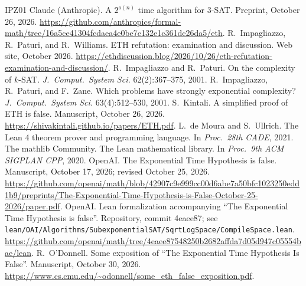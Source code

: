 \documentclass[11pt]{article}
\begin{document}
\begin{thebibliography}{IPZ01}
 Claude (Anthropic). A $2^{o(n)}$ time algorithm for 3-SAT. Preprint, October 26, 2026. \url{https://github.com/anthropics/formal-math/tree/16a5ce41304fcdaea4e0be7c132e1c361dc26da5/eth}.
 R.~Impagliazzo, R.~Paturi, and R.~Williams. ETH refutation: examination and discussion. Web site, October 2026. \url{https://ethdiscussion.blog/2026/10/26/eth-refutation-examination-and-discussion/}.
 R.~Impagliazzo and R.~Paturi. On the complexity of $k$-SAT. \emph{J.\ Comput.\ System Sci.} 62(2):367--375, 2001.
 R.~Impagliazzo, R.~Paturi, and F.~Zane. Which problems have strongly exponential complexity? \emph{J.\ Comput.\ System Sci.} 63(4):512--530, 2001.
 S.~Kintali. A simplified proof of ETH is false. Manuscript, October 26, 2026. \url{https://shivakintali.github.io/papers/ETH.pdf}.
 L.~de Moura and S.~Ullrich. The Lean 4 theorem prover and programming language. In \emph{Proc.\ 28th CADE}, 2021.
 The mathlib Community. The Lean mathematical library. In \emph{Proc.\ 9th ACM SIGPLAN CPP}, 2020.
 OpenAI. The Exponential Time Hypothesis is false. Manuscript, October 17, 2026; revised October 25, 2026. \url{https://github.com/openai/math/blob/42907c9e999cc00d6abe7a50bfc1023250edd1b9/preprints/The-Exponential-Time-Hypothesis-is-False-October-25-2026/paper.pdf}.
 OpenAI. Lean formalization accompanying ``The Exponential Time Hypothesis is false''. Repository, commit 4eaee87; see \texttt{lean/OAI/Algorithms/SubexponentialSAT/SqrtLogSpace/CompileSpace.lean}. \url{https://github.com/openai/math/tree/4eaee87548250b2682affda7d05d947c05554bae/lean}.
 R.~O'Donnell. Some exposition of ``The Exponential Time Hypothesis Is False''. Manuscript, October 30, 2026. \url{https://www.cs.cmu.edu/~odonnell/some_eth_false_exposition.pdf}.
\end{thebibliography}
\end{document}
